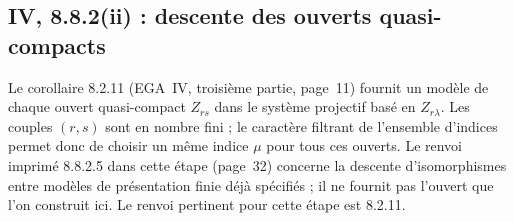 \subsection{IV, 8.8.2(ii) : descente des ouverts quasi-compacts}
Le corollaire 8.2.11 (EGA~IV, troisième partie, page~11) fournit
un modèle de chaque ouvert quasi-compact $Z_{rs}$ dans le système
projectif basé en $Z_{r\lambda}$. Les couples $(r,s)$ sont en nombre
fini ; le caractère filtrant de l'ensemble d'indices permet donc
de choisir un même indice $\mu$ pour tous ces ouverts.
Le renvoi imprimé 8.8.2.5 dans cette étape (page~32) concerne la
descente d'isomorphismes entre modèles de présentation finie déjà
spécifiés ; il ne fournit pas l'ouvert que l'on construit ici.
Le renvoi pertinent pour cette étape est 8.2.11.
